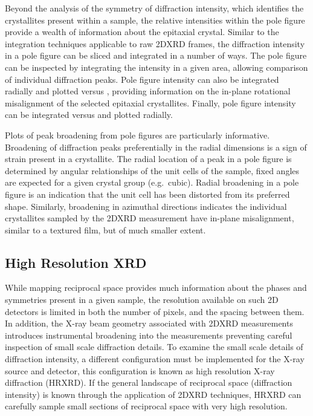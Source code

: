 Beyond the analysis of the symmetry of diffraction intensity, which identifies the crystallites present within a sample, the relative intensities within the pole figure provide a wealth of information about the epitaxial crystal.
Similar to the integration techniques applicable to raw 2DXRD frames, the diffraction intensity in a pole figure can be sliced and integrated in a number of ways.
The pole figure can be inspected by integrating the intensity in a given area, allowing comparison of individual diffraction peaks.
Pole figure intensity can also be integrated radially and plotted versus \textphi{}, providing information on the in-plane rotational misalignment of the selected epitaxial crystallites.
Finally, pole figure intensity can be integrated versus \textphi{} and plotted radially.

Plots of peak broadening from pole figures are particularly informative.
Broadening of diffraction peaks preferentially in the radial dimensions is a sign of strain present in a crystallite.
The radial location of a peak in a pole figure is determined by angular relationships of the unit cells of the sample, fixed angles are expected for a given crystal group (e.g.\ cubic).
Radial broadening in a pole figure is an indication that the unit cell has been distorted from its preferred shape.
Similarly, broadening in azimuthal directions indicates the individual crystallites sampled by the 2DXRD measurement have in-plane misalignment, similar to a textured film, but of much smaller extent.

\subsection{High Resolution XRD} While mapping reciprocal space provides much information about the phases and symmetries present in a given sample, the resolution available on such 2D detectors is limited in both the number of pixels, and the spacing between them.
In addition, the X-ray beam geometry associated with 2DXRD measurements introduces instrumental broadening into the measurements preventing careful inspection of small scale diffraction details.
To examine the small scale details of diffraction intensity, a different configuration must be implemented for the X-ray source and detector, this configuration is known as high resolution X-ray diffraction (HRXRD).
If the general landscape of reciprocal space (diffraction intensity) is known through the application of 2DXRD techniques, HRXRD can carefully sample small sections of reciprocal space with very high resolution.

